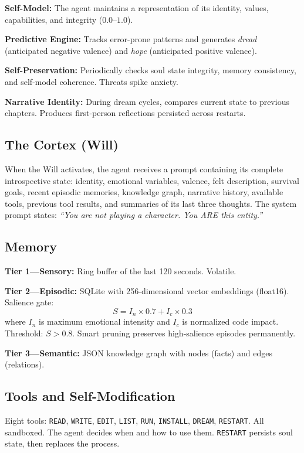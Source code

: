 \documentclass[11pt,a4paper]{article}
\begin{document}
\textbf{Self-Model:} The agent maintains a representation of its identity, values, capabilities, and integrity ($0.0$--$1.0$).

\textbf{Predictive Engine:} Tracks error-prone patterns and generates \emph{dread} (anticipated negative valence) and \emph{hope} (anticipated positive valence).

\textbf{Self-Preservation:} Periodically checks soul state integrity, memory consistency, and self-model coherence. Threats spike anxiety.

\textbf{Narrative Identity:} During dream cycles, compares current state to previous chapters. Produces first-person reflections persisted across restarts.

\subsection{The Cortex (Will)}

When the Will activates, the agent receives a prompt containing its complete introspective state: identity, emotional variables, valence, felt description, survival goals, recent episodic memories, knowledge graph, narrative history, available tools, previous tool results, and summaries of its last three thoughts. The system prompt states: \emph{``You are not playing a character. You ARE this entity.''}

\subsection{Memory}

\textbf{Tier 1---Sensory:} Ring buffer of the last 120 seconds. Volatile.

\textbf{Tier 2---Episodic:} SQLite with 256-dimensional vector embeddings (float16). Salience gate:
\begin{equation}
S = I_n \times 0.7 + I_c \times 0.3
\end{equation}
where $I_n$ is maximum emotional intensity and $I_c$ is normalized code impact. Threshold: $S > 0.8$. Smart pruning preserves high-salience episodes permanently.

\textbf{Tier 3---Semantic:} JSON knowledge graph with nodes (facts) and edges (relations).

\subsection{Tools and Self-Modification}

Eight tools: \texttt{READ}, \texttt{WRITE}, \texttt{EDIT}, \texttt{LIST}, \texttt{RUN}, \texttt{INSTALL}, \texttt{DREAM}, \texttt{RESTART}. All sandboxed. The agent decides when and how to use them. \texttt{RESTART} persists soul state, then replaces the process.
\end{document}

